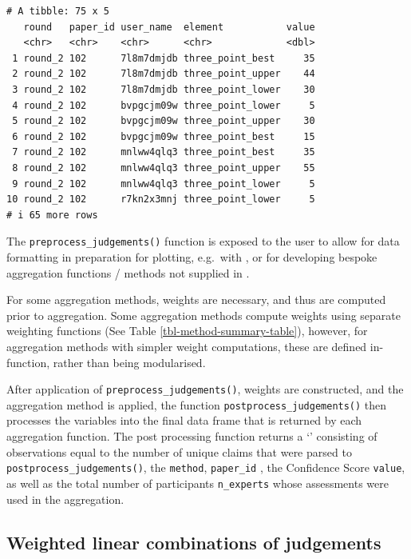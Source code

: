 \documentclass[article]{jss}
\newcommand{\class}[1]{`\code{#1}'}
\begin{document}
\begin{tcolorbox}[enhanced jigsaw, arc=.35mm, bottomrule=.15mm, breakable, colback=white, colframe=quarto-callout-color-frame, left=2mm, leftrule=.75mm, opacityback=0, rightrule=.15mm, toprule=.15mm]
\begin{verbatim}
# A tibble: 75 x 5
   round   paper_id user_name  element           value
   <chr>   <chr>    <chr>      <chr>             <dbl>
 1 round_2 102      7l8m7dmjdb three_point_best     35
 2 round_2 102      7l8m7dmjdb three_point_upper    44
 3 round_2 102      7l8m7dmjdb three_point_lower    30
 4 round_2 102      bvpgcjm09w three_point_lower     5
 5 round_2 102      bvpgcjm09w three_point_upper    30
 6 round_2 102      bvpgcjm09w three_point_best     15
 7 round_2 102      mnlww4qlq3 three_point_best     35
 8 round_2 102      mnlww4qlq3 three_point_upper    55
 9 round_2 102      mnlww4qlq3 three_point_lower     5
10 round_2 102      r7kn2x3mnj three_point_lower     5
# i 65 more rows
\end{verbatim}

The \texttt{preprocess\_judgements()} function is exposed to the user to
allow for data formatting in preparation for plotting, e.g.~with
 \citep{ggplot2016}, or for developing bespoke aggregation
functions / methods not supplied in .

For some aggregation methods, weights are necessary, and thus are
computed prior to aggregation. Some aggregation methods compute weights
using separate weighting functions (See Table
\ref{tbl-method-summary-table}), however, for aggregation methods with
simpler weight computations, these are defined in-function, rather than
being modularised.

After application of \texttt{preprocess\_judgements()}, weights are
constructed, and the aggregation method is applied, the function
\texttt{postprocess\_judgements()} then processes the variables into the
final data frame that is returned by each aggregation function. The post
processing function returns a \class{tibble} consisting of observations
equal to the number of unique claims that were parsed to
\texttt{postprocess\_judgements()}, the \texttt{method},
\texttt{paper\_id} , the Confidence Score \texttt{value}, as well as the
total number of participants \texttt{n\_experts} whose assessments were
used in the aggregation.

\end{tcolorbox}

\subsection{Weighted linear combinations of
judgements}\label{sec-IntWAgg}
\end{document}
